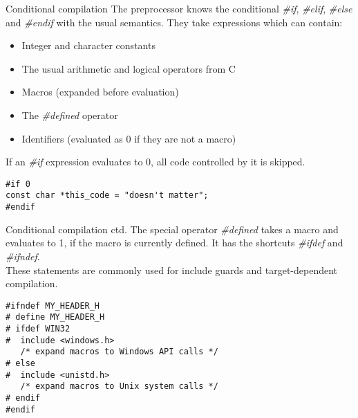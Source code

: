 \begin{frame}[fragile = singleslide]{Conditional compilation}
	The preprocessor knows the conditional \textit{\#if}, \textit{\#elif}, \textit{\#else}
	and \textit{\#endif} with the usual semantics. They take expressions which can contain:
	\begin{itemize}
		\item Integer and character constants
		\item The usual arithmetic and logical operators from C
		\item Macros (expanded before evaluation)
		\item The \textit{\#defined} operator
		\item Identifiers (evaluated as 0 if they are not a macro)
	\end{itemize}
	\bigskip
	If an \textit{\#if} expression evaluates to 0, all code controlled by it is skipped.
	\begin{lstlisting}[numbers=none]
#if 0
const char *this_code = "doesn't matter";
#endif
\end{lstlisting}
\end{frame}

\begin{frame}[fragile = singleslide]{Conditional compilation ctd.}
	The special operator \textit{\#defined} takes a macro and evaluates to 1, if the macro
	is currently defined. It has the shortcuts \textit{\#ifdef} and \textit{\#ifndef}.\\
	\bigskip
	These statements are commonly used for include guards and target-dependent compilation.
	\begin{lstlisting}[numbers=none]
#ifndef MY_HEADER_H
# define MY_HEADER_H
# ifdef WIN32
#  include <windows.h>
   /* expand macros to Windows API calls */
# else
#  include <unistd.h>
   /* expand macros to Unix system calls */
# endif
#endif
\end{lstlisting}
\end{frame}

